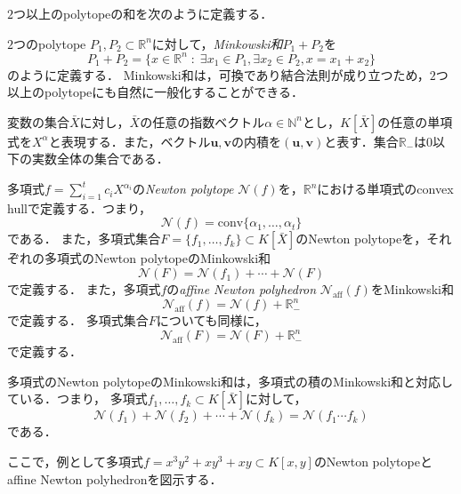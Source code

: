 $2$つ以上のpolytopeの和を次のように定義する．
\begin{definition}
	$2$つのpolytope $P_1, P_2 \subset \mathbb{R}^n$に対して，\emph{Minkowski和}$P_1 + P_2$を
	$$P_1 + P_2 = \{ x \in \mathbb{R}^n \;:\; \exists x_1 \in P_1, \exists x_2 \in P_2, x = x_1 + x_2\}$$
	のように定義する．
	Minkowski和は，可換であり結合法則が成り立つため，$2$つ以上のpolytopeにも自然に一般化することができる．
\end{definition}
変数の集合$\bar{X}$に対し，$\bar{X}$の任意の指数ベクトル$\alpha \in \mathbb{N}^n$とし，$K[\bar{X}]$の任意の単項式を$X^\alpha$と表現する．また，ベクトル$\bm{u}, \bm{v}$の内積を$(\bm{u}, \bm{v})$と表す．集合$\mathbb{R}_{-}$は$0$以下の実数全体の集合である．
\begin{definition}
	多項式$\displaystyle f = \sum_{i=1}^t c_i X^{\alpha_i}$の\emph{Newton polytope} $\mathcal{N}(f)$を，$\mathbb{R}^n$における単項式のconvex hullで定義する．つまり，
	$$\mathcal{N}(f) = \mathrm{conv}\{\alpha_1, \dots, \alpha_t\}$$
	である．
	また，多項式集合$F = \{f_1, \dots, f_k\} \subset K[\bar{X}]$のNewton polytopeを，それぞれの多項式のNewton polytopeのMinkowski和
	$$\mathcal{N}(F) = \mathcal{N}(f_1) + \cdots + \mathcal{N}(F)$$
	で定義する．
	また，多項式$f$の\emph{affine Newton polyhedron} $\mathcal{N}_{\mathrm{aff}}(f)$をMinkowski和
	$$\mathcal{N}_{\mathrm{aff}}(f) = \mathcal{N}(f) + \mathbb{R}_{-}^n$$
	で定義する．
	多項式集合$F$についても同様に，$$\mathcal{N}_{\mathrm{aff}}(F) = \mathcal{N}(F) + \mathbb{R}_{-}^n$$で定義する．
\end{definition}

\begin{remark}
	多項式のNewton polytopeのMinkowski和は，多項式の積のMinkowski和と対応している．つまり，
	多項式$f_1, \dots, f_k \subset K[\bar{X}]$に対して，
	$$\mathcal{N}(f_1) + \mathcal{N}(f_2) + \cdots + \mathcal{N}(f_k) = \mathcal{N}(f_1 \cdots f_k)$$
	である．
\end{remark}

ここで，例として多項式$f = x^3y^2 + xy^3 + xy \subset K[x, y]$のNewton polytopeとaffine Newton polyhedronを図示する．
\\

